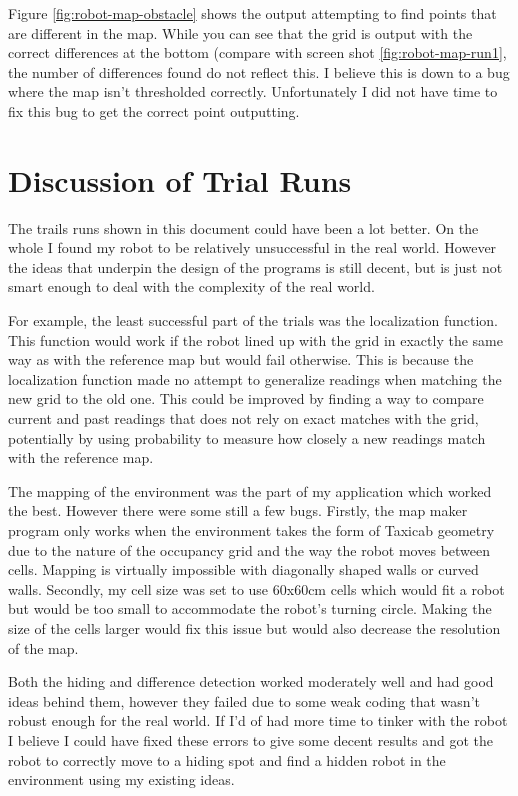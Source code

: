 \documentclass{article}
\begin{document}
Figure \ref{fig:robot-map-obstacle} shows the output attempting to find points that are different in the map. While you can see that the grid is output with the correct differences at the bottom (compare with screen shot \ref{fig:robot-map-run1}, the number of differences found do not reflect this. I believe this is down to a bug where the map isn't thresholded correctly. Unfortunately I did not have time to fix this bug to get the correct point outputting.

\section{Discussion of Trial Runs}
The trails runs shown in this document could have been a lot better. On the whole I found my robot to be relatively unsuccessful in the real world. However the ideas that underpin the design of the programs is still decent, but is just not smart enough to deal with the complexity of the real world.

For example, the least successful part of the trials was the localization function. This function would work if the robot lined up with the grid in exactly the same way as with the reference map but would fail otherwise. This is because the localization function made no attempt to generalize readings when matching the new grid to the old one. This could be improved by finding a way to compare current and past readings that does not rely on exact matches with the grid, potentially by using probability to measure how closely a new readings match with the reference map.

The mapping of the environment was the part of my application which worked the best. However there were some still a few bugs. Firstly, the map maker program only works when the environment takes the form of Taxicab geometry due to the nature of the occupancy grid and the way the robot moves between cells. Mapping is virtually impossible with diagonally shaped walls or curved walls. Secondly, my cell size was set to use 60x60cm cells which would fit a robot but would be too small to accommodate the robot's turning circle. Making the size of the cells larger would fix this issue but would also decrease the resolution of the map.

Both the hiding and difference detection worked moderately well and had good ideas behind them, however they failed due to some weak coding that wasn't robust enough for the real world. If I'd of had more time to tinker with the robot I believe I could have fixed these errors to give some decent results and got the robot to correctly move to a hiding spot and find a hidden robot in the environment using my existing ideas.
\end{document}
